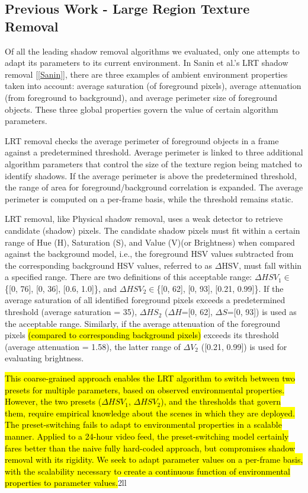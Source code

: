 \subsection{Previous Work - Large Region Texture Removal} \label{section:prevworkLRT}

Of all the leading shadow removal algorithms we evaluated, only one attempts to adapt its parameters to its current environment. In Sanin et al.'s LRT shadow removal [\ref{Sanin}], there are three examples of ambient environment properties taken into account: average saturation (of foreground pixels), average attenuation (from foreground to background), and average perimeter size of foreground objects. These three global properties govern the value of certain algorithm parameters.

LRT removal checks the average perimeter of foreground objects in a frame against a predetermined threshold. Average perimeter is linked to three additional algorithm parameters that control the size of the texture region being matched to identify shadows. If the average perimeter is above the predetermined threshold, the range of area for foreground/background correlation is expanded. The average perimeter is computed on a per-frame basis, while the threshold remains static.

LRT removal, like Physical shadow removal, uses a weak detector to retrieve candidate (shadow) pixels. The candidate shadow pixels must fit within a certain range of Hue (H), Saturation (S), and Value (V)(or Brightness) when compared against the background model, i.e., the foreground HSV values subtracted from the corresponding background HSV values, referred to as $\Delta$HSV, must fall within a specified range. There are two definitions of this acceptable range: $\Delta HSV_{1}\in$\{[0, 76], [0, 36], [0.6, 1.0]\}, and $\Delta HSV_{2}\in$\{[0, 62], [0, 93], [0.21, 0.99]\}. If the average saturation of all identified foreground pixels exceeds a predetermined threshold (average saturation = 35), $\Delta HS_{2}$ ($\Delta H$=[0, 62], $\Delta S$=[0, 93]) is used as the acceptable range. Similarly, if the average attenuation of the foreground pixels \hl{(compared to corresponding background pixels)} exceeds its threshold (average attenuation = 1.58), the latter range of $\Delta V_{2}$ ([0.21, 0.99]) is used for evaluating brightness. 

\hl{This coarse-grained approach enables the LRT algorithm to switch between two presets for multiple parameters, based on observed environmental properties. However, the two presets ($\Delta HSV_{1}$, $\Delta HSV_{2}$), and the thresholds that govern them, require empirical knowledge about the scenes in which they are deployed. The preset-switching fails to adapt to environmental properties in a scalable manner. Applied to a 24-hour video feed, the preset-switching model certainly fares better than the naive fully hard-coded approach, but compromises shadow removal with its rigidity. We seek to adapt parameter values on a per-frame basis, with the scalability necessary to create a continuous function of environmental properties to parameter values.}2ll


